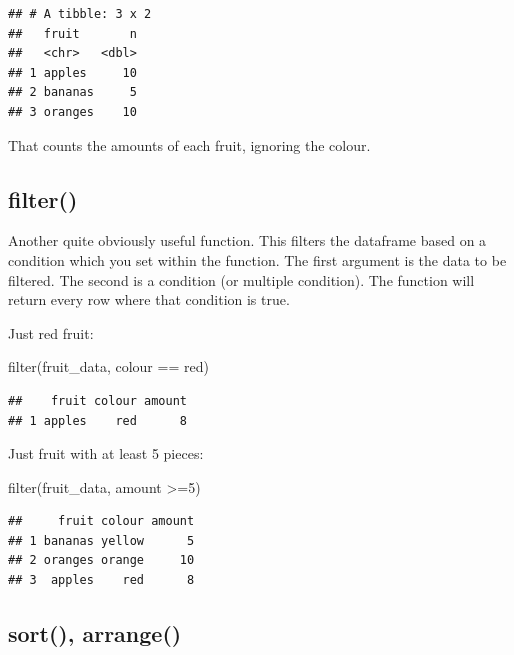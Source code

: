 \documentclass[
]{book}
\newenvironment{Shaded}{\begin{snugshade}}{\end{snugshade}}
\newcommand{\DecValTok}[1]{\textcolor[rgb]{0.00,0.00,0.81}{#1}}
\newcommand{\FunctionTok}[1]{\textcolor[rgb]{0.00,0.00,0.00}{#1}}
\newcommand{\NormalTok}[1]{#1}
\newcommand{\SpecialCharTok}[1]{\textcolor[rgb]{0.00,0.00,0.00}{#1}}
\newcommand{\StringTok}[1]{\textcolor[rgb]{0.31,0.60,0.02}{#1}}
\begin{document}
\begin{verbatim}
## # A tibble: 3 x 2
##   fruit       n
##   <chr>   <dbl>
## 1 apples     10
## 2 bananas     5
## 3 oranges    10
\end{verbatim}

That counts the amounts of each fruit, ignoring the colour.

\hypertarget{filter}{%
\subsection{filter()}\label{filter}}

Another quite obviously useful function. This filters the dataframe based on a condition which you set within the function. The first argument is the data to be filtered. The second is a condition (or multiple condition). The function will return every row where that condition is true.

Just red fruit:

\begin{Shaded}
\begin{Highlighting}[]
\FunctionTok{filter}\NormalTok{(fruit\_data, colour }\SpecialCharTok{==} \StringTok{\textquotesingle{}red\textquotesingle{}}\NormalTok{)}
\end{Highlighting}
\end{Shaded}

\begin{verbatim}
##    fruit colour amount
## 1 apples    red      8
\end{verbatim}

Just fruit with at least 5 pieces:

\begin{Shaded}
\begin{Highlighting}[]
\FunctionTok{filter}\NormalTok{(fruit\_data, amount }\SpecialCharTok{\textgreater{}=}\DecValTok{5}\NormalTok{)}
\end{Highlighting}
\end{Shaded}

\begin{verbatim}
##     fruit colour amount
## 1 bananas yellow      5
## 2 oranges orange     10
## 3  apples    red      8
\end{verbatim}

\hypertarget{sort-arrange}{%
\subsection{sort(), arrange()}\label{sort-arrange}}
\end{document}
